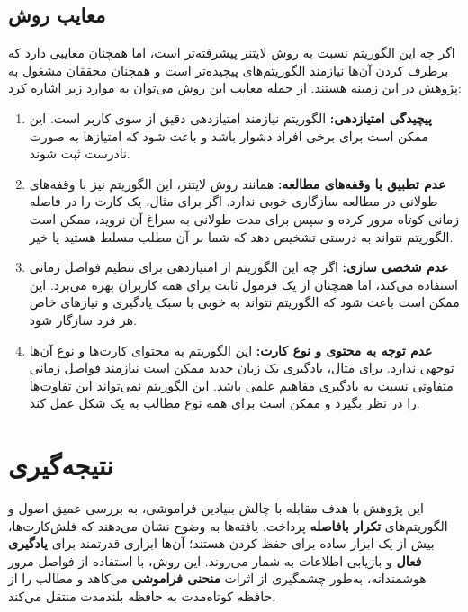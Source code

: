 \documentclass[12pt]{report}
\begin{document}
\section{معایب روش }
اگر چه این الگوریتم نسبت به روش لایتنر پیشرفته‌تر است، اما همچنان معایبی دارد که برطرف کردن آن‌ها نیازمند
الگوریتم‌های پیچیده‌تر است و همچنان محققان مشغول به پژوهش در این زمینه هستند.
از جمله معایب این روش می‌توان به موارد زیر اشاره کرد:

\begin{enumerate}
    \item \textbf{پیچیدگی امتیازدهی:} الگوریتم  نیازمند امتیازدهی دقیق از سوی کاربر است. این ممکن است برای برخی افراد دشوار باشد و باعث شود که امتیازها به صورت نادرست ثبت شوند.
    \item \textbf{عدم تطبیق با وقفه‌های مطالعه:} همانند روش لایتنر، این الگوریتم نیز با وقفه‌های طولانی در مطالعه سازگاری خوبی ندارد. اگر برای مثال، یک کارت را در فاصله زمانی کوتاه مرور کرده و سپس برای مدت طولانی به سراغ آن نروید، ممکن است الگوریتم نتواند به درستی تشخیص دهد که شما بر آن مطلب مسلط هستید یا خیر.
    \item \textbf{عدم شخصی سازی:} اگر چه این الگوریتم از امتیازدهی برای تنظیم فواصل زمانی استفاده می‌کند، اما همچنان از یک فرمول ثابت برای همه کاربران بهره می‌برد. این ممکن است باعث شود که الگوریتم نتواند به خوبی با سبک یادگیری و نیازهای خاص هر فرد سازگار شود.\cite{fsrs}
    \item \textbf{عدم توجه به محتوی و نوع کارت:} این الگوریتم به محتوای کارت‌ها و نوع آن‌ها توجهی ندارد. برای مثال، یادگیری یک زبان جدید ممکن است نیازمند فواصل زمانی متفاوتی نسبت به یادگیری مفاهیم علمی باشد. این الگوریتم نمی‌تواند این تفاوت‌ها را در نظر بگیرد و ممکن است برای همه نوع مطالب به یک شکل عمل کند.\cite{karl}
\end{enumerate}


\chapter*{نتیجه‌گیری}

این پژوهش با هدف مقابله با چالش بنیادین فراموشی، به بررسی عمیق اصول و الگوریتم‌های \textbf{تکرار بافاصله} پرداخت. یافته‌ها به وضوح نشان می‌دهند که فلش‌کارت‌ها، بیش از یک ابزار ساده برای حفظ کردن هستند؛ آن‌ها ابزاری قدرتمند برای \textbf{یادگیری فعال} و بازیابی اطلاعات به شمار می‌روند. این روش، با استفاده از فواصل مرور هوشمندانه، به‌طور چشمگیری از اثرات \textbf{منحنی فراموشی} می‌کاهد و مطالب را از حافظه کوتاه‌مدت به حافظه بلندمدت منتقل می‌کند.
\end{document}
